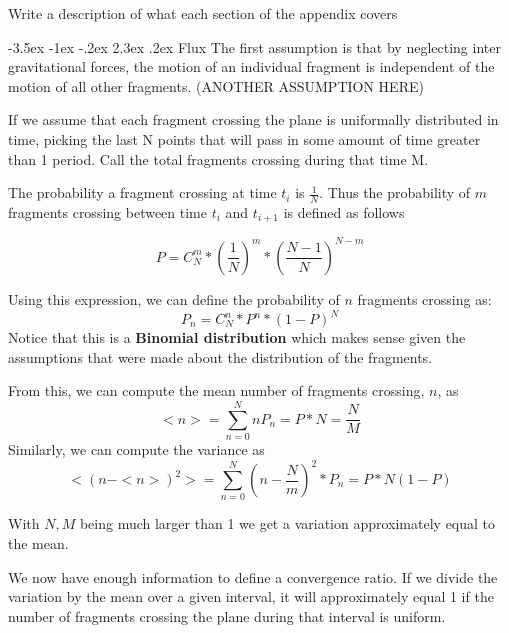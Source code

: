 \documentclass[a4paper, 12pt]{article}
\makeatletter
\renewcommand\section{\clearpage\newpage\@startsection {section}{1}{\z@}%
	{-3.5ex \@plus -1ex \@minus -.2ex}%
	{2.3ex \@plus.2ex}%
	{\normalfont\Large\bfseries}}
\newcommand{\boldindex}[1]{%
	\textbf{#1}\index{#1}%
}
\makeatother
\begin{document}
\newpage
\begin{appendices}
Write a description of what each section of the appendix covers
	
\section{Flux}
The first assumption is that by neglecting inter gravitational forces, the motion of an individual fragment is independent of the motion of all other fragments.  (ANOTHER ASSUMPTION HERE)
	
If we assume that each fragment crossing the plane is uniformally distributed in time, picking the last N points that will pass in some amount of time greater than 1 period. Call the total fragments crossing during that time M.
	
The probability a fragment crossing at time $t_i$ is $\frac{1}{N}$. Thus the probability of $m$ fragments crossing between time $t_i$ and $t_{i+1}$ is defined as follows
	
\begin{equation}
	P = C^m_N * (\frac{1}{N})^m * (\frac{N - 1}{N})^{N-m}
\end{equation}
	
\noindent Using this expression, we can define the probability of $n$ fragments crossing as:
\begin{equation}
	P_n = C^n_N * P^n * (1 - P)^N
\end{equation}
Notice that this is a \boldindex{Binomial distribution} which makes sense given the assumptions that were made about the distribution of the fragments.

From this, we can compute the mean number of fragments crossing, $n$, as
\begin{equation}
	<n> = \sum_{n=0}^{N} n P_n = P * N = \frac{N}{M}
\end{equation}
Similarly, we can compute the variance as
\begin{equation}
	<(n-<n>)^2> = \sum_{n=0}^{N}(n - \frac{N}{m})^2 * P_n = P * N (1 - P)
\end{equation}

With $N, M$ being much larger than 1 we get a variation approximately equal to the mean.

We now have enough information to define a convergence ratio. If we divide the variation by the mean over a given interval, it will approximately equal 1 if the number of fragments crossing the plane during that interval is uniform.
	

\end{appendices}
\end{document}
